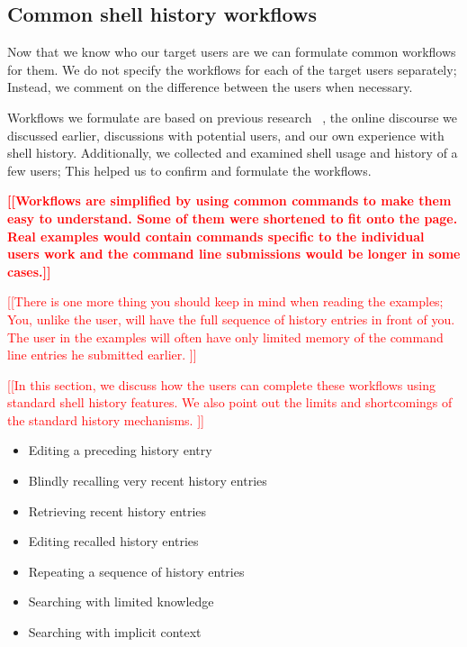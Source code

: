 \documentclass[thesis=M,english]{FITthesis}[2012/10/20]
\newcommand{\todotext}[1]{\textcolor{red}{\textbf{[[#1]]}}}
\newcommand{\redtext}[1]{\textcolor{red}{[[#1]]}}
\let\myCite\cite
\renewcommand\cite{\unskip~\myCite}
\begin{document}
\subsection{Common shell history workflows}

Now that we know who our target users are we can formulate common workflows for them. We do not specify the workflows for each of the target users separately; Instead, we comment on the difference between the users when necessary.

Workflows we formulate are based on previous research \cite{greenberg1993computer}, the online discourse we discussed earlier, discussions with potential users, and our own experience with shell history. Additionally, we collected and examined shell usage and history of a few users; This helped us to confirm and formulate the workflows.

\todotext{Workflows are simplified by using common commands to make them easy to understand. Some of them were shortened to fit onto the page. Real examples would contain commands specific to the individual users work and the command line submissions would be longer in some cases.}

\redtext{There is one more thing you should keep in mind when reading the examples; You, unlike the user, will have the full sequence of history entries in front of you. The user in the examples will often have only limited memory of the command line entries he submitted earlier. }



\redtext{In this section, we discuss how the users can complete these workflows using standard shell history features. We also point out the limits and shortcomings of the standard history mechanisms. }





\begin{itemize}
    \item Editing a preceding history entry
    \item Blindly recalling very recent history entries
    \item Retrieving recent history entries
    \item Editing recalled history entries
    \item Repeating a sequence of history entries
    \item Searching with limited knowledge
    \item Searching with implicit context
\end{itemize}
\end{document}
